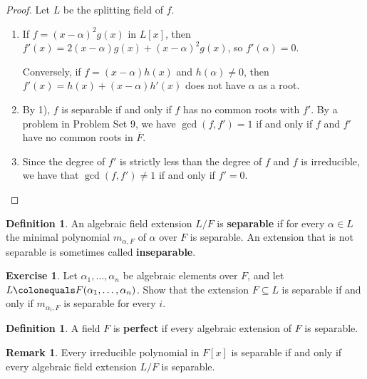 \documentclass[12pt]{report}
\numberwithin{equation}{section}
\numberwithin{theorem}{chapter}
\theoremstyle{definition}
\newtheorem{definition}[theorem]{Definition}
\newtheorem{exercise}{Exercise}
\newtheorem*{basic properties}{Basic Properties}
\newtheorem*{Important Remark}{Important Remark}
\newtheorem{remark}[theorem]{Remark}
\newcommand{\df}[1]{{\bf #1}\index{#1}}
\begin{document}
\begin{proof} 
Let $L$ be the splitting field of $f$. 

\begin{enumerate}[label=\alph*),leftmargin=15pt]
\item If $f = (x-\alpha)^2g(x)$ in $L[x]$, then $f'(x) = 2(x - \alpha) g(x) + (x-\alpha)^2 g(x)$, so $f'(\alpha) = 0$. 

Conversely, if $f = (x-\alpha)h(x)$ and $h(\alpha) \neq 0$, then $f'(x) = h(x) + (x-\alpha)h'(x)$
  does not have $\alpha$ as a root.
  
\item By 1), $f$ is separable if and only if $f$ has no common roots with $f'$. By a problem in Problem Set 9, we have $\gcd(f, f') = 1$ if and only if $f$ and $f'$ have no common roots in $\overline{F}$. 

\item Since the degree of $f'$ is strictly less than the degree of $f$ and $f$ is irreducible, we have that $\gcd(f,f') \neq 1$ if and only if $f' = 0$.\qedhere
\end{enumerate}
\end{proof}





\begin{definition} 
An algebraic field extension $L/F$ is {\bf separable} if for every $\alpha \in L$ the minimal polynomial $m_{\alpha, F}$ of $\alpha$ over $F$ is separable. An extension that is not separable is sometimes called \df{inseparable}.
\end{definition}


\begin{exercise}\label{separable just check generators}
	Let $\alpha_1, \ldots, \alpha_n$ be algebraic elements over $F$, and let $L \colonequals F(\alpha_1, \ldots, \alpha_n)$. Show that the extension $F \subseteq L$ is separable if and only if $m_{\alpha_i, F}$ is separable for every $i$.
\end{exercise}



\begin{definition}
	A field $F$ is {\bf perfect} if every algebraic extension of $F$ is separable. 
\end{definition}


\begin{remark}
Every irreducible polynomial in $F[x]$ is separable if and only if every algebraic field extension $L/F$ is separable.
\end{remark}
\end{document}
